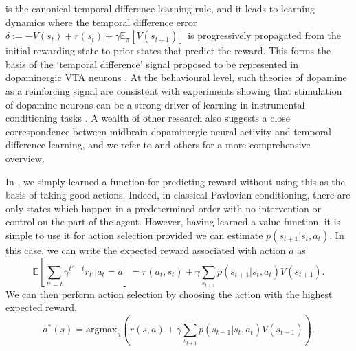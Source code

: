  is the canonical temporal difference learning rule, and it leads to learning dynamics where the temporal difference error $\delta := - V(s_t) + r(s_t) + \gamma \mathbb{E}_\pi \left [ V(s_{t+1}) \right ]$ is progressively propagated from the initial rewarding state to prior states that predict the reward.
This forms the basis of the `temporal difference' signal proposed to be represented in dopaminergic VTA neurons \citep{schultz1997neural}.
At the behavioural level, such theories of dopamine as a reinforcing signal are consistent with experiments showing that stimulation of dopamine neurons can be a strong driver of learning in instrumental conditioning tasks \citep{olds1954positive, tsai2009phasic}.
A wealth of other research also suggests a close correspondence between midbrain dopaminergic neural activity and temporal difference learning, and we refer to \citet{niv2009reinforcement} and others for a more comprehensive overview.

In , we simply learned a function for predicting reward without using this as the basis of taking good actions.
Indeed, in classical Pavlovian conditioning, there are only states which happen in a predetermined order with no intervention or control on the part of the agent.
However, having learned a value function, it is simple to use it for action selection provided we can estimate $p(s_{t+1} | s_t, a_t)$.
In this case, we can write the expected reward associated with action $a$ as
\begin{equation}
    \mathbb{E} \left [\sum_{t' = t} \gamma^{t'-t} r_{t'} | a_t = a \right ] = r(a_t, s_t) + \gamma \sum_{s_{t+1}} p(s_{t+1} | s_t, a_t) V(s_{t+1}).
\end{equation}
We can then perform action selection by choosing the action with the highest expected reward,
\begin{equation}
    \label{eq:value_action_selection}
    a^*(s) = \text{argmax}_{a} \left ( r(s, a) + \gamma \sum_{s_{t+1}} p(s_{t+1} | s_t, a_t) V(s_{t+1}) \right ).
\end{equation}

